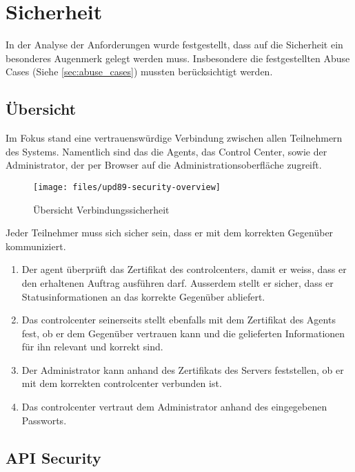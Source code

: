 \section{Sicherheit}
\label{sec:security}

In der Analyse der Anforderungen wurde festgestellt, dass auf die Sicherheit ein besonderes Augenmerk gelegt werden muss. Insbesondere die festgestellten Abuse Cases (Siehe \ref{sec:abuse_cases}) mussten berücksichtigt werden.

\subsection*{Übersicht}

Im Fokus stand eine vertrauenswürdige Verbindung zwischen allen Teilnehmern des Systems. Namentlich sind das die Agents, das Control Center, sowie der Administrator, der per Browser auf die Administrationsoberfläche zugreift.

\begin{figure}
  \centering
    \texttt{[image: files/upd89-security-overview]}
  \caption{Übersicht Verbindungssicherheit}
  \label{fig:sec-overview}
\end{figure}

Jeder Teilnehmer muss sich sicher sein, dass er mit dem korrekten Gegenüber kommuniziert.

\begin{enumerate}[label=\color{orange}\theenumi]
    \item Der \gls{agent} überprüft das Zertifikat des \glspl{controlcenter}, damit er weiss, dass er den erhaltenen Auftrag ausführen darf. Ausserdem stellt er sicher, dass er Statusinformationen an das korrekte Gegenüber abliefert.
    \item Das \gls{controlcenter} seinerseits stellt ebenfalls mit dem Zertifikat des Agents fest, ob er dem Gegenüber vertrauen kann und die gelieferten Informationen für ihn relevant und korrekt sind.
    \item Der Administrator kann anhand des Zertifikats des Servers feststellen, ob er mit dem korrekten \gls{controlcenter} verbunden ist.
    \item Das \gls{controlcenter} vertraut dem Administrator anhand des eingegebenen Passworts.
\end{enumerate}

\subsection*{API Security}

